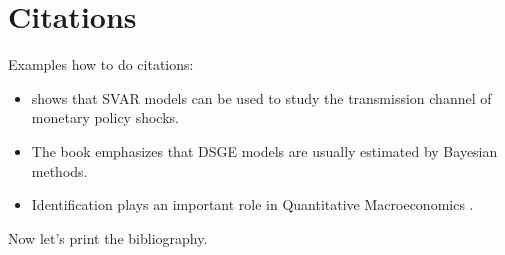 \documentclass[a4paper]{scrartcl}
\begin{document}
\section{Citations}\label{sec:citations}
Examples how to do citations:
\begin{itemize}
  \item \textcite{Sims_1980_MacroeconomicsReality} shows that SVAR models can be used to study the transmission channel of monetary policy shocks.
  \item The book \textcite{Herbst.Schorfheide_2016_BayesianEstimationDSGE} emphasizes that DSGE models are usually estimated by Bayesian methods.
  \item Identification plays an important role in Quantitative Macroeconomics \parencite{Kilian_2013_StructuralVectorAutoregressions,Mutschler_2024_QuantitativeMacroeconomics}.
\end{itemize}
Now let's print the bibliography.
\printbibliography%
\end{document}
